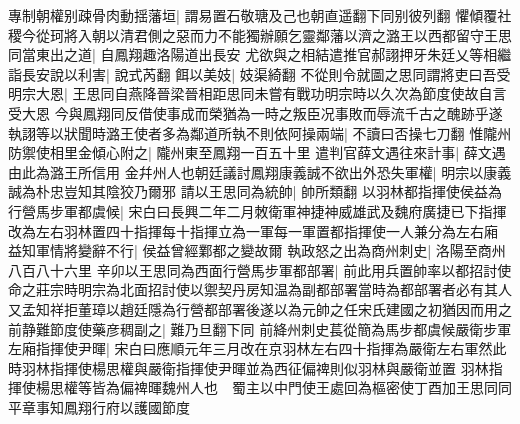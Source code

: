 專制朝權别疎骨肉動揺藩垣|{
	謂易置石敬瑭及己也朝直遥翻下同别彼列翻}
懼傾覆社稷今從珂將入朝以清君側之惡而力不能獨辦願乞靈鄰藩以濟之潞王以西都留守王思同當東出之道|{
	自鳳翔趣洛陽道出長安}
尤欲與之相結遣推官郝詡押牙朱廷乂等相繼詣長安說以利害|{
	說式芮翻}
餌以美妓|{
	妓渠綺翻}
不從則令就圖之思同謂將吏曰吾受明宗大恩|{
	王思同自燕降晉梁晉相距思同未嘗有戰功明宗時以久次為節度使故自言受大恩}
今與鳳翔同反借使事成而榮猶為一時之叛臣况事敗而辱流千古之醜跡乎遂執詡等以狀聞時潞王使者多為鄰道所執不則依阿操兩端|{
	不讀曰否操七刀翻}
惟隴州防禦使相里金傾心附之|{
	隴州東至鳳翔一百五十里}
遣判官薛文遇往來計事|{
	薛文遇由此為潞王所信用}
金幷州人也朝廷議討鳳翔康義誠不欲出外恐失軍權|{
	明宗以康義誠為朴忠豈知其陰狡乃爾邪}
請以王思同為統帥|{
	帥所類翻}
以羽林都指揮使侯益為行營馬步軍都虞候|{
	宋白曰長興二年二月敇衛軍神捷神威雄武及魏府廣捷已下指揮改為左右羽林置四十指揮每十指揮立為一軍每一軍置都指揮使一人兼分為左右廂}
益知軍情將變辭不行|{
	侯益曾經鄴都之變故爾}
執政怒之出為商州刺史|{
	洛陽至商州八百八十六里}
辛卯以王思同為西面行營馬步軍都部署|{
	前此用兵置帥率以都招討使命之莊宗時明宗為北面招討使以禦契丹房知温為副都部署當時為都部署者必有其人又孟知祥拒董璋以趙廷隱為行營都部署後遂以為元帥之任宋氏建國之初猶因而用之}
前静難節度使藥彦稠副之|{
	難乃旦翻下同}
前絳州刺史萇從簡為馬步都虞候嚴衛步軍左廂指揮使尹暉|{
	宋白曰應順元年三月改在京羽林左右四十指揮為嚴衛左右軍然此時羽林指揮使楊思權與嚴衛指揮使尹暉並為西征偏禆則似羽林與嚴衛並置}
羽林指揮使楊思權等皆為偏禆暉魏州人也　蜀主以中門使王處回為樞密使丁酉加王思同同平章事知鳳翔行府以護國節度

